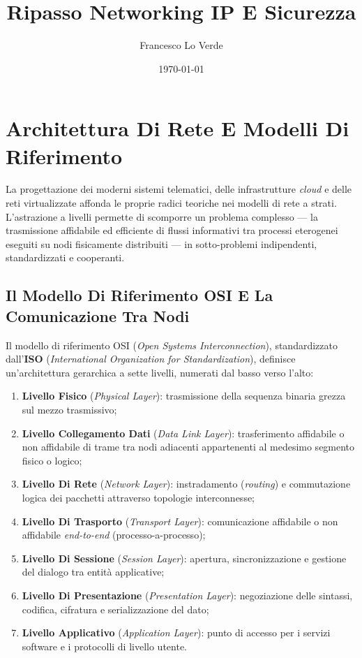 \documentclass[11pt, a4paper]{article}
\title{Ripasso Networking IP E Sicurezza}
\date{\today}
\author{Francesco Lo Verde}
\begin{document}
\maketitle

\section{Architettura Di Rete E Modelli Di Riferimento}

La progettazione dei moderni sistemi telematici, delle infrastrutture \emph{cloud} e delle reti virtualizzate affonda le proprie radici teoriche nei modelli di rete a strati. L'astrazione a livelli permette di scomporre un problema complesso — la trasmissione affidabile ed efficiente di flussi informativi tra processi eterogenei eseguiti su nodi fisicamente distribuiti — in sotto-problemi indipendenti, standardizzati e cooperanti.

\subsection{Il Modello Di Riferimento OSI E La Comunicazione Tra Nodi}

Il modello di riferimento OSI (\emph{Open Systems Interconnection}), standardizzato dall'\textbf{ISO} (\emph{International Organization for Standardization}), definisce un'architettura gerarchica a sette livelli, numerati dal basso verso l'alto:
\begin{enumerate}[noitemsep]
    \item \textbf{Livello Fisico} (\emph{Physical Layer}): trasmissione della sequenza binaria grezza sul mezzo trasmissivo;
    \item \textbf{Livello Collegamento Dati} (\emph{Data Link Layer}): trasferimento affidabile o non affidabile di trame tra nodi adiacenti appartenenti al medesimo segmento fisico o logico;
    \item \textbf{Livello Di Rete} (\emph{Network Layer}): instradamento (\emph{routing}) e commutazione logica dei pacchetti attraverso topologie interconnesse;
    \item \textbf{Livello Di Trasporto} (\emph{Transport Layer}): comunicazione affidabile o non affidabile \emph{end-to-end} (processo-a-processo);
    \item \textbf{Livello Di Sessione} (\emph{Session Layer}): apertura, sincronizzazione e gestione del dialogo tra entità applicative;
    \item \textbf{Livello Di Presentazione} (\emph{Presentation Layer}): negoziazione delle sintassi, codifica, cifratura e serializzazione del dato;
    \item \textbf{Livello Applicativo} (\emph{Application Layer}): punto di accesso per i servizi software e i protocolli di livello utente.
\end{enumerate}
\end{document}
